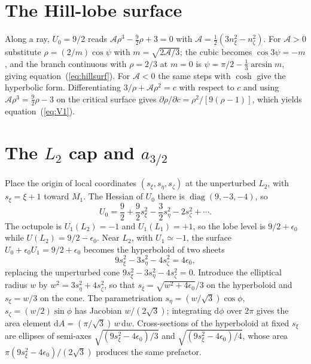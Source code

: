 \documentclass[twocolumn]{aastex702}
\newcommand{\dd}{\mathrm{d}}
\begin{document}
\section{The Hill-lobe surface}\label{app:hill}

Along a ray, $U_0=9/2$ reads $\mathcal A\rho^3-\tfrac92\rho+3=0$ with $\mathcal A=\tfrac12(3n_\xi^2-n_\zeta^2)$. For $\mathcal A>0$ substitute $\rho=(2/m)\cos\psi$ with $m=\sqrt{2\mathcal A/3}$; the cubic becomes $\cos3\psi=-m$, and the branch continuous with $\rho=2/3$ at $m=0$ is $\psi=\pi/2-\tfrac13\arcsin m$, giving equation~(\ref{eq:hillsurf}). For $\mathcal A<0$ the same steps with $\cosh$ give the hyperbolic form. Differentiating $3/\rho+\mathcal A\rho^2=c$ with respect to $c$ and using $\mathcal A\rho^3=\tfrac92\rho-3$ on the critical surface gives $\partial\rho/\partial c=\rho^2/[9(\rho-1)]$, which yields equation~(\ref{eq:V1}).

\section{The $L_2$ cap and $a_{3/2}$}\label{app:a32}

Place the origin of local coordinates $(s_\xi,s_\eta,s_\zeta)$ at the unperturbed $L_2$, with $s_\xi=\xi+1$ toward $M_1$. The Hessian of $U_0$ there is $\operatorname{diag}(9,-3,-4)$, so
\begin{equation}
U_0=\frac92+\frac92 s_\xi^2-\frac32 s_\eta^2-2s_\zeta^2+\cdots.
\end{equation}
The octupole is $U_1(L_2)=-1$ and $U_1(L_1)=+1$, so the lobe level is $9/2+\epsilon_0$ while $U(L_2)=9/2-\epsilon_0$. Near $L_2$, with $U_1\simeq-1$, the surface $U_0+\epsilon_0 U_1=9/2+\epsilon_0$ becomes the hyperboloid of two sheets
\begin{equation}
9s_\xi^2-3s_\eta^2-4s_\zeta^2=4\epsilon_0,
\end{equation}
replacing the unperturbed cone $9s_\xi^2-3s_\eta^2-4s_\zeta^2=0$. Introduce the elliptical radius $w$ by $w^2=3s_\eta^2+4s_\zeta^2$, so that $s_\xi=\sqrt{w^2+4\epsilon_0}/3$ on the hyperboloid and $s_\xi=w/3$ on the cone. The parametrisation $s_\eta=(w/\sqrt3)\cos\phi$, $s_\zeta=(w/2)\sin\phi$ has Jacobian $w/(2\sqrt3)$; integrating $\dd\phi$ over $2\pi$ gives the area element $\dd A=(\pi/\sqrt3)\,w\,\dd w$. Cross-sections of the hyperboloid at fixed $s_\xi$ are ellipses of semi-axes $\sqrt{(9s_\xi^2-4\epsilon_0)/3}$ and $\sqrt{(9s_\xi^2-4\epsilon_0)/4}$, whose area $\pi(9s_\xi^2-4\epsilon_0)/(2\sqrt3)$ produces the same prefactor.
\end{document}
